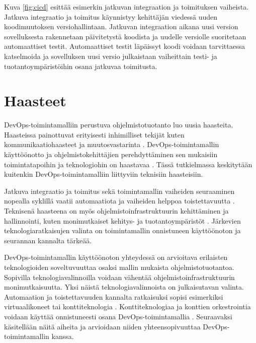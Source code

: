 Kuva \ref{fig:cicd} esittää esimerkin jatkuvan integraation ja toimituksen vaiheista.
Jatkuva integraatio ja toimitus käynnistyy kehittäjän viedessä uuden koodimuutoksen versiohallintaan.
Jatkuvan integraation aikana uusi version sovelluksesta rakennetaan päivitetystä koodista ja uudelle versiolle suoritetaan automaattiset testit.
Automaattiset testit läpäissyt koodi voidaan tarvittaessa katselmoida ja sovelluksen uusi versio julkaistaan vaiheittain testi- ja tuotantoympäristöihin osana jatkuvaa toimitusta.

\section{Haasteet}

DevOps-toimintamalliin perustuva ohjelmistotuotanto luo uusia haasteita.
Haasteissa painottuvat erityisesti inhimilliset tekijät kuten kommunikaatiohaasteet ja muutosvastarinta \cite{Kalliosaari16}.
DevOps-toimintamallin käyttöönotto ja ohjelmistokehittäjien perehdyttäminen sen mukaisiin toimintatapoihin ja teknologiohin on haastavaa \cite{Leite19}.
Tässä tutkielmassa keskitytään kuitenkin DevOps-toimintamalliin liittyviin teknisiin haasteisiin.

Jatkuva integraatio ja toimitus sekä toimintamallin vaiheiden seuraaminen nopealla syklillä vaatii automaatiota ja vaiheiden helppoa toistettavuutta \cite{Jabbari16, Leite19}.
Teknisenä haasteena on myös ohjelmistoinfrastruktuurin kehittäminen ja hallinnointi, kuten monimutkaiset kehitys- ja tuotantoympäristöt \cite{Khan22, Kalliosaari16}.
Järkevien teknologiaratkaisujen valinta on toimintamallin onnistuneen käyttöönoton ja seurannan kannalta tärkeää.

DevOps-toimintamallin käyttöönoton yhteydessä on arvioitava erilaisten teknologioiden soveltuvuuttaa osaksi mallin mukaista ohjelmistotuotantoa.
Sopivilla teknologiavalinnoilla voidaan vähentää ohjelmistoinfrastruktuurin monimutkaisuutta.
Yksi näistä teknologiavalinnoista on julkaisutavan valinta.
Automaation ja toistettavuuden kannalta ratkaisuksi sopisi esimerkiksi virtuaalikoneet tai konttiteknologia \cite{Dua14}.
Konttiteknologiaa ja konttien orkestrointia voidaan käyttää onnistuneesti osana DevOps-toimintamallia \mbox{\cite{Kang16, Narasimhulu23}}.
Seuraavaksi käsitellään näitä aiheita ja arvioidaan niiden yhteensopivuuttaa DevOps-toimintamallin kanssa.
